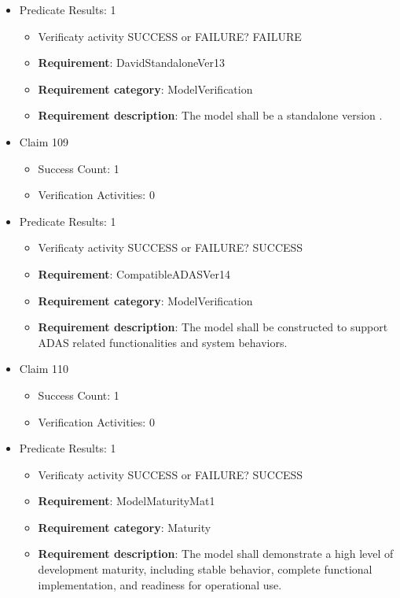 \documentclass{article}
\begin{document}
\begin{itemize}
									    
				\item Predicate Results: 1
					\begin{itemize}				
					\item Verificaty activity SUCCESS or FAILURE? FAILURE
					
					\item \textbf{Requirement}: DavidStandaloneVer13 
					\item \textbf{Requirement category}: ModelVerification
					\item \textbf{Requirement description}: The model shall be a standalone version .
					\end{itemize}

  				  \item Claim 109
				\begin{itemize}
			    	\item Success Count: 1 
			    	\item Verification Activities: 0
				\end{itemize}
				
									    
				\item Predicate Results: 1
					\begin{itemize}				
					\item Verificaty activity SUCCESS or FAILURE? SUCCESS
					
					\item \textbf{Requirement}: CompatibleADASVer14 
					\item \textbf{Requirement category}: ModelVerification
					\item \textbf{Requirement description}: The model shall be constructed to support ADAS related functionalities and system behaviors.
					\end{itemize}

  				  \item Claim 110
				\begin{itemize}
			    	\item Success Count: 1 
			    	\item Verification Activities: 0
				\end{itemize}
				
									    
				\item Predicate Results: 1
					\begin{itemize}				
					\item Verificaty activity SUCCESS or FAILURE? SUCCESS
					
					\item \textbf{Requirement}: ModelMaturityMat1 
					\item \textbf{Requirement category}: Maturity
					\item \textbf{Requirement description}: The model shall demonstrate a high level of development maturity, including stable behavior, complete functional implementation, and readiness for operational use.
					\end{itemize}


\end{itemize}
\end{document}
